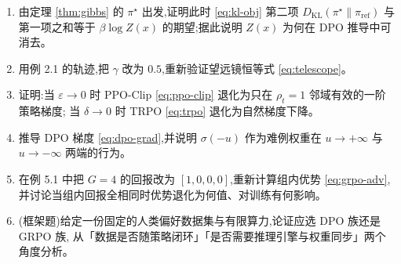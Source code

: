 \documentclass[11pt]{article}
\newcommand{\KL}{D_{\mathrm{KL}}}
\newcommand{\piref}{\pi_{\mathrm{ref}}}
\newcommand{\sig}{\sigma}
\theoremstyle{plain}
\theoremstyle{definition}
\theoremstyle{remark}
\begin{document}
\begin{enumerate}[leftmargin=1.6em,itemsep=3pt]
\item 由定理 \ref{thm:gibbs} 的 $\pi^\star$ 出发,证明此时 \eqref{eq:kl-obj} 第二项 $\KL(\pi^\star\|\piref)$
与第一项之和等于 $\beta\log Z(x)$ 的期望;据此说明 $Z(x)$ 为何在 DPO 推导中可消去。
\item 用例 2.1 的轨迹,把 $\gamma$ 改为 $0.5$,重新验证望远镜恒等式 \eqref{eq:telescope}。
\item 证明:当 $\varepsilon\to0$ 时 PPO-Clip \eqref{eq:ppo-clip} 退化为只在 $\rho_t=1$ 邻域有效的一阶策略梯度;
当 $\delta\to0$ 时 TRPO \eqref{eq:trpo} 退化为自然梯度下降。
\item 推导 DPO 梯度 \eqref{eq:dpo-grad},并说明 $\sig(-u)$ 作为难例权重在 $u\to+\infty$ 与 $u\to-\infty$ 两端的行为。
\item 在例 5.1 中把 $G=4$ 的回报改为 $[1,0,0,0]$,重新计算组内优势 \eqref{eq:grpo-adv},
并讨论当组内回报全相同时优势退化为何值、对训练有何影响。
\item (框架题)给定一份固定的人类偏好数据集与有限算力,论证应选 DPO 族还是 GRPO 族,
从「数据是否随策略闭环」「是否需要推理引擎与权重同步」两个角度分析。
\end{enumerate}
\end{document}
